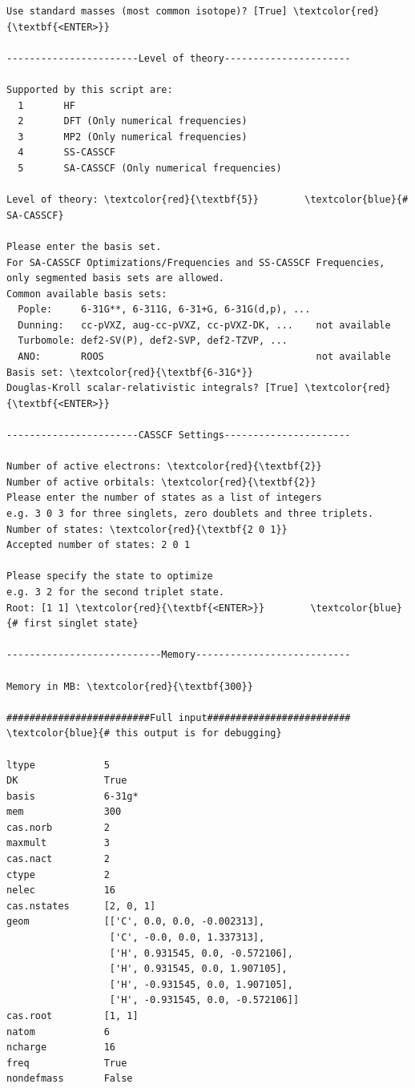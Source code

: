 \documentclass[a4paper,11pt,DIV=15,openany]{scrbook}
\begin{document}
\begin{oframed}
\begin{Verbatim}[commandchars=\\\{\}]
Use standard masses (most common isotope)? [True] \textcolor{red}{\textbf{<ENTER>}}

-----------------------Level of theory----------------------

Supported by this script are:
  1       HF
  2       DFT (Only numerical frequencies)
  3       MP2 (Only numerical frequencies)
  4       SS-CASSCF
  5       SA-CASSCF (Only numerical frequencies)

Level of theory: \textcolor{red}{\textbf{5}}        \textcolor{blue}{# SA-CASSCF}

Please enter the basis set.
For SA-CASSCF Optimizations/Frequencies and SS-CASSCF Frequencies,
only segmented basis sets are allowed.
Common available basis sets:
  Pople:     6-31G**, 6-311G, 6-31+G, 6-31G(d,p), ...
  Dunning:   cc-pVXZ, aug-cc-pVXZ, cc-pVXZ-DK, ...    not available
  Turbomole: def2-SV(P), def2-SVP, def2-TZVP, ...
  ANO:       ROOS                                     not available
Basis set: \textcolor{red}{\textbf{6-31G*}}
Douglas-Kroll scalar-relativistic integrals? [True] \textcolor{red}{\textbf{<ENTER>}}

-----------------------CASSCF Settings----------------------

Number of active electrons: \textcolor{red}{\textbf{2}}
Number of active orbitals: \textcolor{red}{\textbf{2}}
Please enter the number of states as a list of integers
e.g. 3 0 3 for three singlets, zero doublets and three triplets.
Number of states: \textcolor{red}{\textbf{2 0 1}}
Accepted number of states: 2 0 1

Please specify the state to optimize
e.g. 3 2 for the second triplet state.
Root: [1 1] \textcolor{red}{\textbf{<ENTER>}}        \textcolor{blue}{# first singlet state}

---------------------------Memory---------------------------

Memory in MB: \textcolor{red}{\textbf{300}}

#########################Full input#########################        \textcolor{blue}{# this output is for debugging}

ltype            5
DK               True
basis            6-31g*
mem              300
cas.norb         2
maxmult          3
cas.nact         2
ctype            2
nelec            16
cas.nstates      [2, 0, 1]
geom             [['C', 0.0, 0.0, -0.002313], 
                  ['C', -0.0, 0.0, 1.337313], 
                  ['H', 0.931545, 0.0, -0.572106], 
                  ['H', 0.931545, 0.0, 1.907105], 
                  ['H', -0.931545, 0.0, 1.907105], 
                  ['H', -0.931545, 0.0, -0.572106]]
cas.root         [1, 1]
natom            6
ncharge          16
freq             True
nondefmass       False


\end{Verbatim}
\end{oframed}
\end{document}
